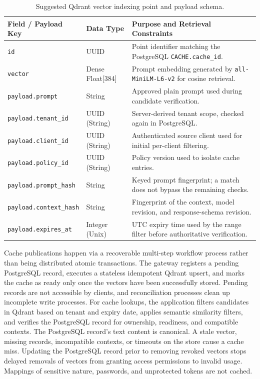 \documentclass{FastFyp}
\begin{document}
\begin{table}[H]
\centering
\small
\setlength{\tabcolsep}{4pt}
\renewcommand{\arraystretch}{1.12}
\caption{Suggested Qdrant vector indexing point and payload schema.}
\label{tab:qdrant_dict_table}
\begin{tabular}{|P{3.8cm}|P{2.4cm}|P{8.0cm}|}
\hline
\textbf{Field / Payload Key} & \textbf{Data Type} & \textbf{Purpose and Retrieval Constraints} \\ \hline
\texttt{id} & UUID & Point identifier matching the PostgreSQL \texttt{CACHE.cache\_id}. \\ \hline
\texttt{vector} & Dense Float[384] & Prompt embedding generated by \texttt{all-MiniLM-L6-v2} for cosine retrieval. \\ \hline
\texttt{payload.prompt} & String & Approved plain prompt used during candidate verification. \\ \hline
\texttt{payload.tenant\_id} & UUID (String) & Server-derived tenant scope, checked again in PostgreSQL. \\ \hline
\texttt{payload.client\_id} & UUID (String) & Authenticated source client used for initial per-client filtering. \\ \hline
\texttt{payload.policy\_id} & UUID (String) & Policy version used to isolate cache entries. \\ \hline
\texttt{payload.prompt\_hash} & String & Keyed prompt fingerprint; a match does not bypass the remaining checks. \\ \hline
\texttt{payload.context\_hash} & String & Fingerprint of the context, model revision, and response-schema revision. \\ \hline
\texttt{payload.expires\_at} & Integer (Unix) & UTC expiry time used by the range filter before authoritative verification. \\ \hline
\end{tabular}

\end{table}

Cache publications happen via a recoverable multi-step workflow process rather than being distributed atomic transactions. The gateway registers a pending PostgreSQL record, executes a stateless idempotent Qdrant upsert, and marks the cache as ready only once the vectors have been successfully stored. Pending records are not accessible by clients, and reconciliation processes clean up incomplete write processes.
For cache lookups, the application filters candidates in Qdrant based on tenant and expiry date, applies semantic similarity filters, and verifies the PostgreSQL record for ownership, readiness, and compatible contexts. The PostgreSQL record's text content is canonical. A stale vector, missing records, incompatible contexts, or timeouts on the store cause a cache miss. Updating the PostgreSQL record prior to removing revoked vectors stops delayed removals of vectors from granting access permissions to invalid usage. Mappings of sensitive nature, passwords, and unprotected tokens are not cached.
\end{document}
